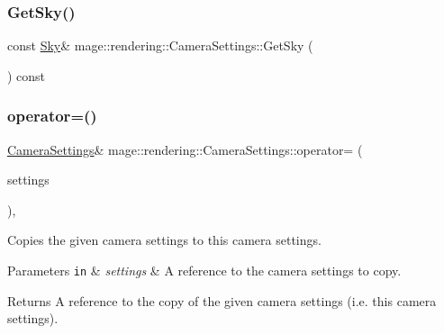 \hypertarget{classmage_1_1rendering_1_1_camera_settings_a0045fb85eafcb33dff43c04656c4cc3b}{}\label{classmage_1_1rendering_1_1_camera_settings_a0045fb85eafcb33dff43c04656c4cc3b} 
\subsubsection{\texorpdfstring{Get\+Sky()}{GetSky()}\hspace{0.1cm}{\footnotesize\ttfamily [2/2]}}
{\footnotesize\ttfamily const \hyperlink{classmage_1_1rendering_1_1_sky}{Sky}\& mage\+::rendering\+::\+Camera\+Settings\+::\+Get\+Sky (\begin{DoxyParamCaption}{ }\end{DoxyParamCaption}) const\hspace{0.3cm}{\ttfamily [noexcept]}}

\hypertarget{classmage_1_1rendering_1_1_camera_settings_a8cc59c883ea4c45a6bb7e9dc728856fd}{}\label{classmage_1_1rendering_1_1_camera_settings_a8cc59c883ea4c45a6bb7e9dc728856fd} 
\subsubsection{\texorpdfstring{operator=()}{operator=()}\hspace{0.1cm}{\footnotesize\ttfamily [1/2]}}
{\footnotesize\ttfamily \hyperlink{classmage_1_1rendering_1_1_camera_settings}{Camera\+Settings}\& mage\+::rendering\+::\+Camera\+Settings\+::operator= (\begin{DoxyParamCaption}\item[{const \hyperlink{classmage_1_1rendering_1_1_camera_settings}{Camera\+Settings} \&}]{settings }\end{DoxyParamCaption})\hspace{0.3cm}{\ttfamily [default]}, {\ttfamily [noexcept]}}

Copies the given camera settings to this camera settings.


\begin{DoxyParams}[1]{Parameters}
\mbox{\tt in}  & {\em settings} & A reference to the camera settings to copy. \\
\hline
\end{DoxyParams}
\begin{DoxyReturn}{Returns}
A reference to the copy of the given camera settings (i.\+e. this camera settings). 
\end{DoxyReturn}
\hypertarget{classmage_1_1rendering_1_1_camera_settings_a28ae670d467adfc74ef8929f24b2e615}{}\label{classmage_1_1rendering_1_1_camera_settings_a28ae670d467adfc74ef8929f24b2e615} 
